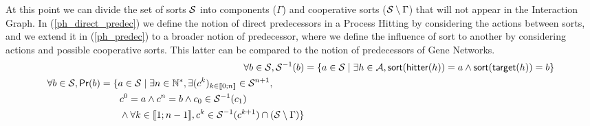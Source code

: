 At this point we can divide the set of sorts $\mathcal{S}$ into components ($\Gamma$) and cooperative sorts ($\mathcal{S} \setminus \Gamma$) that will not appear in the Interaction Graph. In (\ref{ph_direct_predec}) we define the notion of direct predecessors in a Process Hitting by considering the actions between sorts, and we extend it in (\ref{ph_predec}) to a broader notion of predecessor, where we define the influence of sort to another by considering actions and possible cooperative sorts. This latter can be compared to the notion of predecessors of Gene Networks.
\begin{align}
\label{ph_direct_predec}
  \forall b \in \mathcal{S}, \mathcal{S}^{-1}(b) &= \{a \in \mathcal{S} \mid \exists h \in \mathcal{A}, \mathsf{sort}(\mathsf{hitter}(h)) = a \wedge \mathsf{sort}(\mathsf{target}(h)) = b\} \\
\begin{split}\label{ph_predec}
  \forall b \in \mathcal{S}, \mathsf{Pr}(b) &= \{a \in \mathcal{S} \mid \exists n \in \mathbb{N}^*, \exists (c^k)_{k \in \llbracket 0 ; n \rrbracket} \in \mathcal{S}^{n+1}, \\
                                   & \quad \quad c^0 = a \wedge c^n = b \wedge c_0 \in \mathcal{S}^{-1}(c_1) \\
                                   & \quad \quad \wedge \forall k \in \llbracket 1 ; n-1 \rrbracket, c^k \in \mathcal{S}^{-1}(c^{k+1}) \cap (\mathcal{S}\setminus\Gamma)\}
\end{split}
\end{align}

